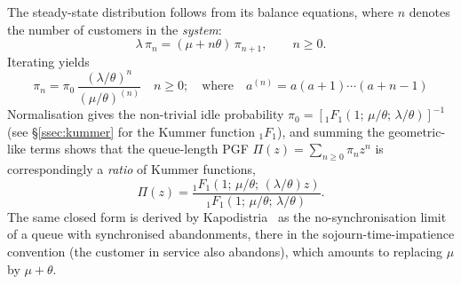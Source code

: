 The steady-state distribution follows from its balance equations, where $n$ denotes the number of customers in the \emph{system}:
\begin{equation*}
    \lambda\,\pi_n = (\mu + n\theta)\,\pi_{n+1}, \qquad n \ge 0.
\end{equation*}
Iterating yields
\begin{equation*}
    \pi_n = \pi_0\,\frac{(\lambda/\theta)^n}{(\mu/\theta)^{(n)}} \quad n \ge 0;
    \quad \text{where} \quad a^{(n)} = a(a+1)\cdots(a+n-1)
\end{equation*}
Normalisation gives the non-trivial idle probability $\pi_0 = [{}_1F_1(1;\,\mu/\theta;\,\lambda/\theta)]^{-1}$ (see \S\ref{ssec:kummer} for the Kummer function ${}_1F_1$), and summing the geometric-like terms shows that the queue-length PGF $\Pi(z)=\sum_{n\ge0}\pi_n z^n$ is correspondingly a \emph{ratio} of Kummer functions,
\begin{equation*}
    \Pi(z) = \frac{{}_1F_1(1;\,\mu/\theta;\,(\lambda/\theta)z)}{{}_1F_1(1;\,\mu/\theta;\,\lambda/\theta)}.
\end{equation*}
The same closed form is derived by Kapodistria~\cite[Thm.~3]{kapodistria2011synchronized} as the no-synchronisation limit of a queue with synchronised abandonments, there in the sojourn-time-impatience convention (the customer in service also abandons), which amounts to replacing $\mu$ by $\mu+\theta$.

